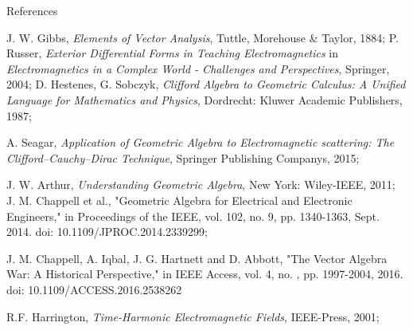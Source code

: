 \documentclass[handout,10pt]{beamer}
\begin{document}
\begin{frame}[allowframebreaks]{References}


\begin{thebibliography}{99}
%
%
%
J. W. Gibbs, \emph{Elements of Vector Analysis}, Tuttle, Morehouse \& Taylor, 1884;
P. Russer, \emph{Exterior Differential Forms in Teaching Electromagnetics} in \emph{Electromagnetics in a Complex World - Challenges and Perspectives}, Springer, 2004;
D. Hestenes, G. Sobczyk, \emph{Clifford Algebra to Geometric Calculus: A Unified Language for  Mathematics and Physics}, Dordrecht: Kluwer Academic Publishers, 1987;

A. Seagar, \emph{Application of Geometric Algebra to Electromagnetic scattering: The Clifford--Cauchy--Dirac Technique}, Springer Publishing Companys, 2015;


J. W. Arthur, \emph{Understanding Geometric Algebra}, New York: Wiley-IEEE, 2011;
J. M. Chappell et al., "Geometric Algebra for Electrical and Electronic Engineers," in Proceedings of the IEEE, vol. 102, no. 9, pp. 1340-1363, Sept. 2014. doi: 10.1109/JPROC.2014.2339299;

J. M. Chappell, A. Iqbal, J. G. Hartnett and D. Abbott, "The Vector Algebra War: A Historical Perspective," in IEEE Access, vol. 4, no. , pp. 1997-2004, 2016.
doi: 10.1109/ACCESS.2016.2538262

R.F. Harrington, \emph{Time-Harmonic Electromagnetic Fields}, IEEE-Press, 2001;

%
\end{thebibliography}
\end{frame}





\end{document}
